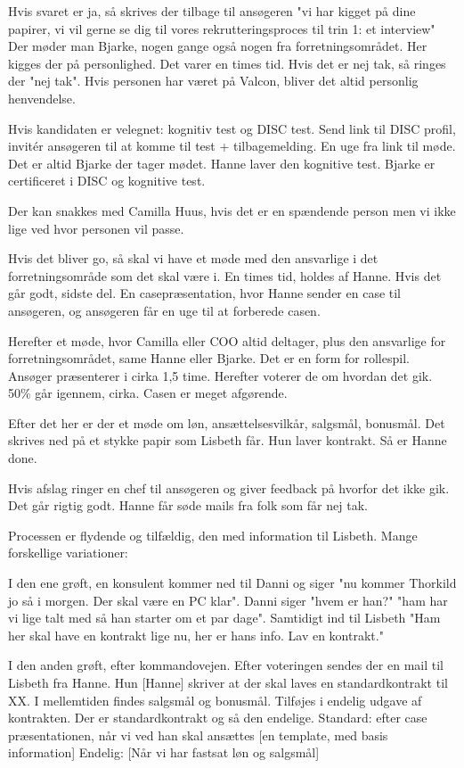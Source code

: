 \begin{linenumbers*}
Hvis svaret er ja, så skrives der tilbage til ansøgeren "vi har kigget på dine papirer, vi vil gerne se dig til vores rekrutteringsproces til trin 1: et interview" Der møder man Bjarke, nogen gange også nogen fra forretningsområdet.
Her kigges der på personlighed. Det varer en times tid.
Hvis det er nej tak, så ringes der "nej tak". Hvis personen har været på Valcon, bliver det altid personlig henvendelse.

Hvis kandidaten er velegnet: kognitiv test og DISC test. Send link til DISC profil, invitér ansøgeren til at komme til test + tilbagemelding.
En uge fra link til møde. Det er altid Bjarke der tager mødet. Hanne laver den kognitive test. Bjarke er certificeret i DISC og kognitive test.

Der kan snakkes med Camilla Huus, hvis det er en spændende person men vi ikke lige ved hvor personen vil passe. 

Hvis det bliver go, så skal vi have et møde med den ansvarlige i det forretningsområde som det skal være i. En times tid, holdes af Hanne.
Hvis det går godt, sidste del. En casepræsentation, hvor Hanne sender en case til ansøgeren, og ansøgeren får en uge til at forberede casen.

Herefter et møde, hvor Camilla eller COO altid deltager, plus den ansvarlige for forretningsområdet, same Hanne eller Bjarke. Det er en form for rollespil.
Ansøger præsenterer i cirka 1,5 time. 
Herefter voterer de om hvordan det gik. 50\% går igennem, cirka. Casen er meget afgørende.

Efter det her er der et møde om løn, ansættelsesvilkår, salgsmål, bonusmål. Det skrives ned på et stykke papir som Lisbeth får. Hun laver kontrakt. Så er Hanne done.

Hvis afslag ringer en chef til ansøgeren og giver feedback på hvorfor det ikke gik. Det går rigtig godt. Hanne får søde mails fra folk som får nej tak.


Processen er flydende og tilfældig, den med information til Lisbeth. 
Mange forskellige variationer:

I den ene grøft, en konsulent kommer ned til Danni og siger "nu kommer Thorkild jo så i morgen. Der skal være en PC klar". Danni siger "hvem er han?" "ham har vi lige talt med så han starter om et par dage".
Samtidigt ind til Lisbeth "Ham her skal have en kontrakt lige nu, her er hans info. Lav en kontrakt."

I den anden grøft, efter kommandovejen. Efter voteringen sendes der en mail til Lisbeth fra Hanne. Hun [Hanne] skriver at der skal laves en standardkontrakt til XX. I mellemtiden findes salgsmål og bonusmål. Tilføjes i endelig udgave af kontrakten.
Der er standardkontrakt og så den endelige. 
Standard: efter case præsentationen, når vi ved han skal ansættes [en template, med basis information]
Endelig: [Når vi har fastsat løn og salgsmål]


\end{linenumbers*}
